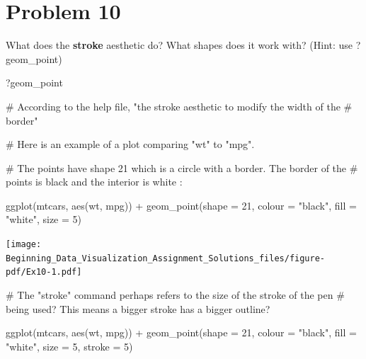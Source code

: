 \documentclass[
  letterpaper,
  DIV=11,
  numbers=noendperiod]{scrreprt}
\newenvironment{Shaded}{\begin{snugshade}}{\end{snugshade}}
\newcommand{\AttributeTok}[1]{\textcolor[rgb]{0.40,0.45,0.13}{#1}}
\newcommand{\CommentTok}[1]{\textcolor[rgb]{0.37,0.37,0.37}{#1}}
\newcommand{\DecValTok}[1]{\textcolor[rgb]{0.68,0.00,0.00}{#1}}
\newcommand{\FunctionTok}[1]{\textcolor[rgb]{0.28,0.35,0.67}{#1}}
\newcommand{\NormalTok}[1]{\textcolor[rgb]{0.00,0.23,0.31}{#1}}
\newcommand{\SpecialCharTok}[1]{\textcolor[rgb]{0.37,0.37,0.37}{#1}}
\newcommand{\StringTok}[1]{\textcolor[rgb]{0.13,0.47,0.30}{#1}}
\begin{document}
\section*{Problem 10}\label{problem-10-3}


What does the \textbf{stroke} aesthetic do? What shapes does it work
with? (Hint: use ?geom\_point)

\begin{Shaded}
\begin{Highlighting}[]
\NormalTok{?geom\_point}

\CommentTok{\# According to the help file, "the stroke aesthetic to modify the width of the}
\CommentTok{\# border"}

\CommentTok{\# Here is an example of a plot comparing "wt" to "mpg".}

\CommentTok{\# The points have shape 21 which is a circle with a border. The border of the}
\CommentTok{\# points is black and the interior is white : }

\FunctionTok{ggplot}\NormalTok{(mtcars, }\FunctionTok{aes}\NormalTok{(wt, mpg)) }\SpecialCharTok{+}
  \FunctionTok{geom\_point}\NormalTok{(}\AttributeTok{shape =} \DecValTok{21}\NormalTok{, }\AttributeTok{colour =} \StringTok{"black"}\NormalTok{, }\AttributeTok{fill =} \StringTok{"white"}\NormalTok{, }\AttributeTok{size =} \DecValTok{5}\NormalTok{)}
\end{Highlighting}
\end{Shaded}

\texttt{[image: Beginning\_Data\_Visualization\_Assignment\_Solutions\_files/figure-pdf/Ex10-1.pdf]}

\begin{Shaded}
\begin{Highlighting}[]
\CommentTok{\# The "stroke" command perhaps refers to the size of the stroke of the pen }
\CommentTok{\# being used? This means a bigger stroke has a bigger outline?}

\FunctionTok{ggplot}\NormalTok{(mtcars, }\FunctionTok{aes}\NormalTok{(wt, mpg)) }\SpecialCharTok{+}
  \FunctionTok{geom\_point}\NormalTok{(}\AttributeTok{shape =} \DecValTok{21}\NormalTok{, }\AttributeTok{colour =} \StringTok{"black"}\NormalTok{, }\AttributeTok{fill =} \StringTok{"white"}\NormalTok{, }\AttributeTok{size =} \DecValTok{5}\NormalTok{, }\AttributeTok{stroke =} \DecValTok{5}\NormalTok{)}
\end{Highlighting}
\end{Shaded}
\end{document}

